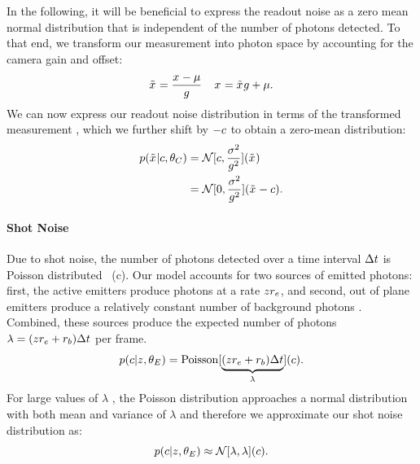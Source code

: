   In the following, it will be beneficial to express the readout noise as a
  zero mean normal distribution that is independent of the number of photons
  detected. To that end, we transform our measurement \x{} into photon space
  by accounting for the camera gain and offset:
  \begin{equation}
    \tilde{x}_{} = \frac{x_{} - \mu}{g}
    \;\;\;\;
    x_{} = \tilde{x}_{}g + \mu
    \text{.}
  \end{equation}
  We can now express our readout noise distribution in terms of the transformed
  measurement \xp{}, which we further shift by $-c$ to obtain a
  zero-mean distribution:
  \begin{align}
    p(\tilde{x}_{}|c,\theta_C)
      &= \mathcal{N}[c, \frac{\sigma^2}{g^2}](\tilde{x}_{})  \\
      &= \mathcal{N}[0, \frac{\sigma^2}{g^2}](\tilde{x}_{} - c)
      \label{eq:method:transformed_readout_noise}
    \text{.}
  \end{align}

\paragraph{Shot Noise}
\label{sec:shot_noise}

Due to shot noise, the number of photons detected over a time interval
$\Delta t$ is Poisson distributed~\cite{mehta_poisson_2016}
(c).
  Our model accounts for two sources of emitted photons: first, the \z{} active
  emitters produce photons at a rate $z_{}r_e$, and second, out of plane
  emitters produce a relatively constant number of background photons \rb.
  Combined, these sources produce the expected number of photons
  $\lambda=(z_{}r_e + r_b)\Delta t$ per frame.
  \begin{equation}
    p(c|z_{},\theta_E)
      = \operatorname{Poisson}[\underbrace{(z_{}r_e + r_b)\Delta t}_{\lambda}](c)
    \text{.}
    \label{eq:methods:p_c_given_z}
  \end{equation}
  For large values of $\lambda$ , the Poisson distribution
  approaches a normal distribution with both mean and variance of $\lambda$
   and therefore we
  approximate our shot noise distribution as:
  \begin{equation}
    p(c|z_{},\theta_E)
      \approx \mathcal{N}[\lambda, \lambda](c)
    \text{.}
    \label{eq:method:normal_approx_shot_noise}
  \end{equation}

